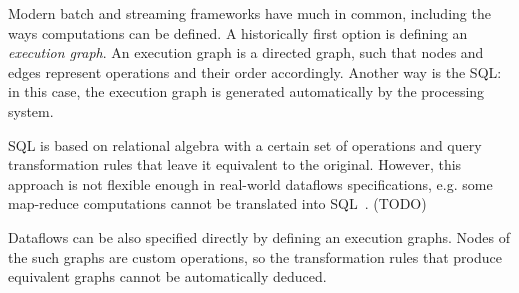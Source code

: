 Modern batch and streaming frameworks have much in common, including the ways computations can be defined.
A historically first option is defining an {\em execution graph}.
An execution graph is a directed graph, such that nodes and edges represent operations and their order accordingly.
Another way is the SQL: in this case, the execution graph is generated automatically by the processing system.


SQL is based on relational algebra with a certain set of operations and query transformation rules that leave it equivalent to the original.
However, this approach is not flexible enough in real-world dataflows specifications,
e.g. some map-reduce computations cannot be translated into SQL~\cite{PROOF}.
(TODO)




Dataflows can be also specified directly by defining an execution graphs.
Nodes of the such graphs are custom operations, so the transformation rules that produce equivalent graphs cannot be automatically deduced.




